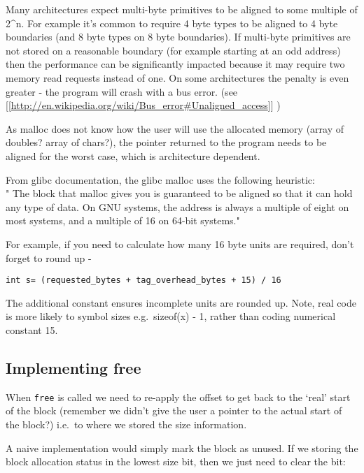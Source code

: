 Many architectures expect multi-byte primitives to be aligned to some
multiple of 2\^{}n. For example it's common to require 4 byte types to
be aligned to 4 byte boundaries (and 8 byte types on 8 byte boundaries).
If multi-byte primitives are not stored on a reasonable boundary (for
example starting at an odd address) then the performance can be
significantly impacted because it may require two memory read requests
instead of one. On some architectures the penalty is even greater - the
program will crash with a bus error. (see
{[}{[}\url{http://en.wikipedia.org/wiki/Bus_error\#Unaligned_access}{]}{]}
)

As malloc does not know how the user will use the allocated memory
(array of doubles? array of chars?), the pointer returned to the program
needs to be aligned for the worst case, which is architecture dependent.

From glibc documentation, the glibc malloc uses the following
heuristic:\\" The block that malloc gives you is guaranteed to be
aligned so that it can hold any type of data. On GNU systems, the
address is always a multiple of eight on most systems, and a multiple of
16 on 64-bit systems."

For example, if you need to calculate how many 16 byte units are
required, don't forget to round up -

\begin{verbatim}
int s= (requested_bytes + tag_overhead_bytes + 15) / 16
\end{verbatim}

The additional constant ensures incomplete units are rounded up. Note,
real code is more likely to symbol sizes e.g.~sizeof(x) - 1, rather than
coding numerical constant 15.

\subsection{Implementing free}\label{implementing-free}

When \texttt{free} is called we need to re-apply the offset to get back
to the `real' start of the block (remember we didn't give the user a
pointer to the actual start of the block?) i.e.~to where we stored the
size information.

A naive implementation would simply mark the block as unused. If we
storing the block allocation status in the lowest size bit, then we just
need to clear the bit:

\begin{Shaded}
\begin{Highlighting}[]
\NormalTok{; }
\end{Highlighting}
\end{Shaded}

